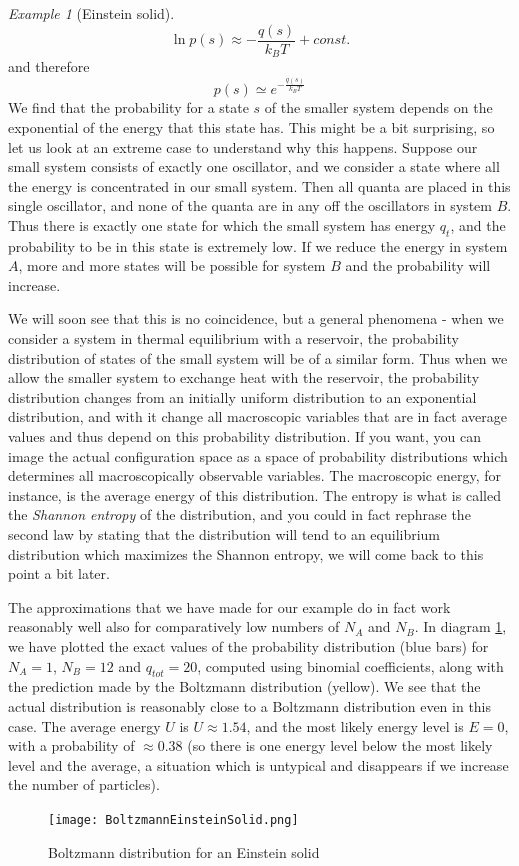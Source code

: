 \documentclass[a4paper, draft]{article}
\theoremstyle{own}
\theoremstyle{remark}
\newtheorem{example}{Example}[section]
\begin{document}
\begin{example}[Einstein solid]
$$
\ln p(s) \approx - \frac{q(s)}{k_B T} + const.
$$ 
and therefore 
$$
p(s) \simeq e^{- \frac{q(s)}{k_B T}}
$$
We find that the probability for a state $s$ of the smaller system depends on the exponential of the energy that this state has. This might be a bit surprising, so let us look at an extreme case to understand why this happens. Suppose our small system consists of exactly one oscillator, and we consider a state where all the energy is concentrated in our small system. Then all quanta are placed in this single oscillator, and none of the quanta are in any off the oscillators in system $B$. Thus there is exactly one state for which the small system has energy $q_t$, and the probability to be in this state is extremely low. If we reduce the energy in system $A$, more and more states will be possible for system $B$ and the probability will increase. 

We will soon see that this is no coincidence, but a general phenomena - when we consider a system in thermal equilibrium with a reservoir, the probability distribution of states of the small system will be of a similar form. Thus when we allow the smaller system to exchange heat with the reservoir, the probability distribution changes from an initially uniform distribution to an exponential distribution, and with it change all macroscopic variables that are in fact average values and thus depend on this probability distribution. If you want, you can image the actual configuration space as a space of probability distributions which determines all macroscopically observable variables. The macroscopic energy, for instance, is the average energy of this distribution. The entropy is what is called the {\em Shannon entropy} of the distribution, and you could in fact rephrase the second law by stating that the distribution will tend to an equilibrium distribution which maximizes the Shannon entropy, we will come back to this point a bit later.


The approximations that we have made for our example do in fact work reasonably well also for comparatively low numbers of $N_A$ and $N_B$. In diagram \ref{fig:BoltzmannEinsteinSolid}, we have plotted the exact values of the probability distribution (blue bars) for $N_A = 1$, $N_B = 12$ and $q_{tot} = 20$, computed using binomial coefficients, along with the prediction made by the Boltzmann distribution (yellow). We see that the actual distribution is reasonably close to a Boltzmann distribution even in this case. The average energy $U$ is $U \approx 1.54$, and the most likely energy level is $E = 0$, with a probability of $\approx 0.38$ (so there is one energy level below the most likely level and the average, a situation which is untypical and disappears if we increase the number of particles).
	
	\begin{figure}[ht]
		\centering
		\texttt{[image: BoltzmannEinsteinSolid.png]}
		\caption{Boltzmann distribution for an Einstein solid}
		\label{fig:BoltzmannEinsteinSolid}
	\end{figure}
	
	
\end{example}
\end{document}
